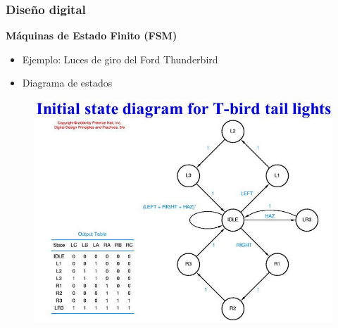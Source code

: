 \documentclass[aspectratio=169,compress]{beamer}
\begin{document}
\begin{footnotesize}
\begin{frame}[fragile]
\frametitle{Diseño digital}
\begin{center}\textbf{Máquinas de Estado Finito (FSM)}\end{center}
\begin{itemize}
\item Ejemplo: Luces de giro del Ford Thunderbird
\item Diagrama de estados
\end{itemize}
\begin{figure}
\includegraphics[scale=0.25]{images/fsm4.jpg} 
\end{figure}
\end{frame}


\end{footnotesize}
\end{document}
